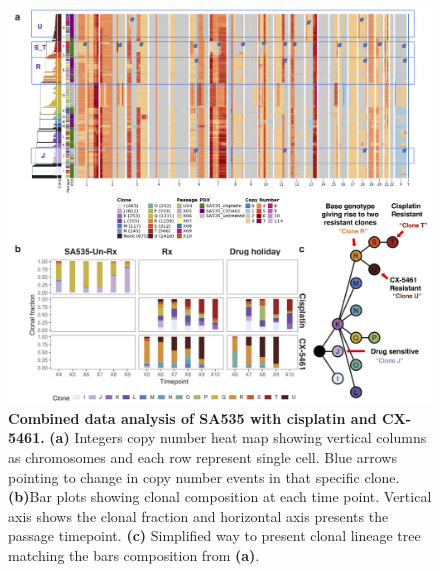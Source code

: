 \begin{figure}
\centering
\includegraphics[width=\textwidth]{Figures/chap4/SA535combinebarplots.png}
	
\caption[Combined data analysis of SA535 with cisplatin and CX-5461]
	{\small
	\textbf{Combined data analysis of SA535 with cisplatin and CX-5461.}
		\textbf{(a)} Integers copy number heat map showing vertical columns as chromosomes and each row represent single cell. Blue arrows pointing to change in copy number events in that specific clone. \textbf{(b)}Bar plots showing clonal composition at each time point. Vertical axis shows the clonal fraction and horizontal axis presents the passage timepoint. \textbf{(c)} Simplified way to present clonal lineage tree matching the bars composition from \textbf{(a)}.
	}
	\label{fig:SA535combinebarplots}
\end{figure}


